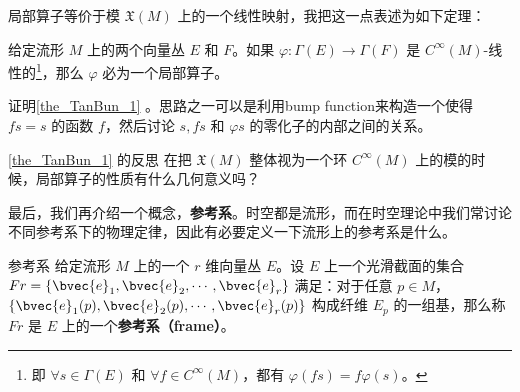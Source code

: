 局部算子等价于模 $\mathfrak{X}(M)$ 上的一个线性映射，我把这一点表述为如下定理：

\begin{theorem}{}\label{the_TanBun_1}
给定流形 $M$ 上的两个向量丛 $E$ 和 $F$。如果 $\varphi:\Gamma(E)\rightarrow\Gamma(F)$ 是 $C^\infty(M)$-线性的\footnote{即 $\forall s\in\Gamma(E)$ 和 $\forall f\in C^\infty(M)$，都有 $\varphi(fs)=f\varphi(s)$。}，那么 $\varphi$ 必为一个局部算子。
\end{theorem}

\begin{exercise}{}
证明\autoref{the_TanBun_1} 。思路之一可以是利用bump function来构造一个使得 $fs=s$ 的函数 $f$，然后讨论 $s, fs$ 和 $\varphi{s}$ 的零化子的内部之间的关系。
\end{exercise}

\begin{exercise}{\autoref{the_TanBun_1} 的反思}
在把 $\mathfrak{X}(M)$ 整体视为一个环 $C^\infty(M)$ 上的模的时候，局部算子的性质有什么几何意义吗？
\end{exercise}

最后，我们再介绍一个概念，\textbf{参考系}。时空都是流形，而在时空理论中我们常讨论不同参考系下的物理定律，因此有必要定义一下流形上的参考系是什么。

\begin{definition}{参考系}
给定流形 $M$ 上的一个 $r$ 维向量丛 $E$。设 $E$ 上一个光滑截面的集合 $Fr=\{\bvec{e}_1, \bvec{e}_2, \cdots, \bvec{e}_r\}$ 满足：对于任意 $p\in M$，$\{\bvec{e}_1(p), \bvec{e}_2(p), \cdots, \bvec{e}_r(p)\}$ 构成纤维 $E_p$ 的一组基，那么称 $Fr$ 是 $E$ 上的一个\textbf{参考系（frame）}。
\end{definition}










